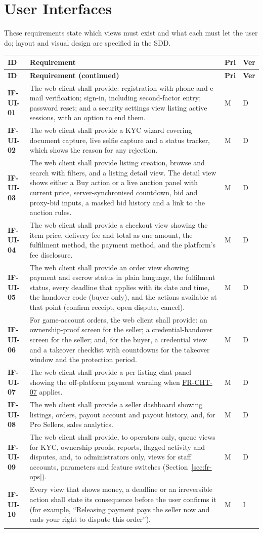 \documentclass[11pt,a4paper]{report}
\makeatletter
\newenvironment{reqs}{%
  \small
  \begin{longtable}{@{}>{\raggedright\arraybackslash}p{2.35cm}
                       >{\raggedright\arraybackslash}p{10.3cm}
                       >{\centering\arraybackslash}p{0.7cm}
                       >{\centering\arraybackslash}p{0.7cm}@{}}
  \toprule
  \textbf{ID} & \textbf{Requirement} & \textbf{Pri} & \textbf{Ver} \\
  \midrule
  \endfirsthead
  \toprule
  \textbf{ID} & \textbf{Requirement (continued)} & \textbf{Pri} & \textbf{Ver} \\
  \midrule
  \endhead
  \bottomrule
  \endfoot
}{\end{longtable}}
\newcommand{\req}[5]{\leavevmode\textbf{#1}\hypertarget{#1}{} & #5 & #2 & #3 \\ \addlinespace[2pt]}
\newcommand{\rr}[1]{\hyperlink{#1}{#1}}
\makeatother
\begin{document}
\section{User Interfaces}
These requirements state which views must exist and what each must let the user do; layout and visual design are specified in the SDD.
\begin{reqs}
\req{IF-UI-01}{M}{D}{new}{The web client shall provide: registration with phone and e-mail verification; sign-in, including second-factor entry; password reset; and a security settings view listing active sessions, with an option to end them.}
\req{IF-UI-02}{M}{D}{new}{The web client shall provide a KYC wizard covering document capture, live selfie capture and a status tracker, which shows the reason for any rejection.}
\req{IF-UI-03}{M}{D}{new}{The web client shall provide listing creation, browse and search with filters, and a listing detail view. The detail view shows either a Buy action or a live auction panel with current price, server-synchronised countdown, bid and proxy-bid inputs, a masked bid history and a link to the auction rules.}
\req{IF-UI-04}{M}{D}{new}{The web client shall provide a checkout view showing the item price, delivery fee and total as one amount, the fulfilment method, the payment method, and the platform's fee disclosure.}
\req{IF-UI-05}{M}{D}{new}{The web client shall provide an order view showing payment and escrow status in plain language, the fulfilment status, every deadline that applies with its date and time, the handover code (buyer only), and the actions available at that point (confirm receipt, open dispute, cancel).}
\req{IF-UI-06}{M}{D}{new}{For game-account orders, the web client shall provide: an ownership-proof screen for the seller; a credential-handover screen for the seller; and, for the buyer, a credential view and a takeover checklist with countdowns for the takeover window and the protection period.}
\req{IF-UI-07}{M}{D}{new}{The web client shall provide a per-listing chat panel showing the off-platform payment warning when \rr{FR-CHT-07} applies.}
\req{IF-UI-08}{M}{D}{new}{The web client shall provide a seller dashboard showing listings, orders, payout account and payout history, and, for Pro Sellers, sales analytics.}
\req{IF-UI-09}{M}{D}{new}{The web client shall provide, to operators only, queue views for KYC, ownership proofs, reports, flagged activity and disputes, and, to administrators only, views for staff accounts, parameters and feature switches (Section~\ref{sec:fr-ops}).}
\req{IF-UI-10}{M}{I}{new}{Every view that shows money, a deadline or an irreversible action shall state its consequence before the user confirms it (for example, ``Releasing payment pays the seller now and ends your right to dispute this order'').}
\end{reqs}
\end{document}
